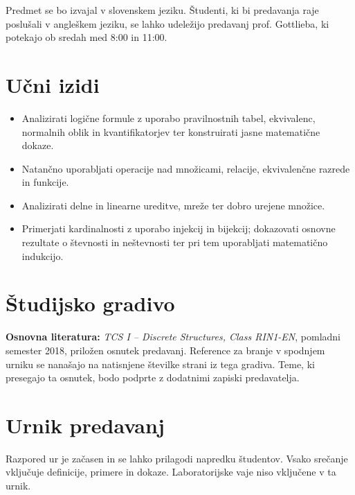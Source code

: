 \documentclass[11pt, a4paper]{article}
\begin{document}
Predmet se bo izvajal v slovenskem jeziku. Študenti, ki bi predavanja raje poslušali v angleškem jeziku, se lahko udeležijo predavanj prof. Gottlieba, ki potekajo ob sredah med 8:00 in 11:00.

\section*{Učni izidi}
\begin{itemize}[label={\color{primary}\textbullet}]
    \item Analizirati logične formule z uporabo pravilnostnih tabel, ekvivalenc, normalnih oblik in kvantifikatorjev ter konstruirati jasne matematične dokaze.
    \item Natančno uporabljati operacije nad množicami, relacije, ekvivalenčne razrede in funkcije.
    \item Analizirati delne in linearne ureditve, mreže ter dobro urejene množice.
    \item Primerjati kardinalnosti z uporabo injekcij in bijekcij; dokazovati osnovne rezultate o števnosti in neštevnosti ter pri tem uporabljati matematično indukcijo.
\end{itemize}

\section*{Študijsko gradivo}

\textbf{Osnovna literatura:} \textit{TCS I – Discrete Structures, Class RIN1-EN}, pomladni semester 2018, priložen osnutek predavanj. Reference za branje v spodnjem urniku se nanašajo na natisnjene številke strani iz tega gradiva. Teme, ki presegajo ta osnutek, bodo podprte z dodatnimi zapiski predavatelja.

\section*{Urnik predavanj}

Razpored ur je začasen in se lahko prilagodi napredku študentov. Vsako srečanje vključuje definicije, primere in dokaze. Laboratorijske vaje niso vključene v ta urnik.
\end{document}
